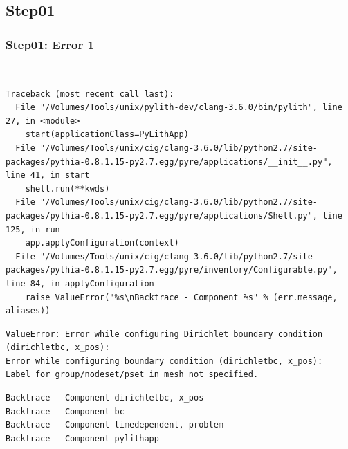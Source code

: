 \documentclass{beamer}
\begin{document}
\subsection{Step01}

\begin{frame}[fragile]
  \frametitle{Step01: Error 1}

\\
\begin{lstlisting}
Traceback (most recent call last):
  File "/Volumes/Tools/unix/pylith-dev/clang-3.6.0/bin/pylith", line 27, in <module>
    start(applicationClass=PyLithApp)
  File "/Volumes/Tools/unix/cig/clang-3.6.0/lib/python2.7/site-packages/pythia-0.8.1.15-py2.7.egg/pyre/applications/__init__.py", line 41, in start
    shell.run(**kwds)
  File "/Volumes/Tools/unix/cig/clang-3.6.0/lib/python2.7/site-packages/pythia-0.8.1.15-py2.7.egg/pyre/applications/Shell.py", line 125, in run
    app.applyConfiguration(context)
  File "/Volumes/Tools/unix/cig/clang-3.6.0/lib/python2.7/site-packages/pythia-0.8.1.15-py2.7.egg/pyre/inventory/Configurable.py", line 84, in applyConfiguration
    raise ValueError("%s\nBacktrace - Component %s" % (err.message, aliases))
\end{lstlisting}
\begin{lstlisting}
ValueError: Error while configuring Dirichlet boundary condition (dirichletbc, x_pos):
Error while configuring boundary condition (dirichletbc, x_pos):
Label for group/nodeset/pset in mesh not specified.
\end{lstlisting}
\begin{lstlisting}
Backtrace - Component dirichletbc, x_pos
Backtrace - Component bc
Backtrace - Component timedependent, problem
Backtrace - Component pylithapp
\end{lstlisting}
  
\end{frame}
\end{document}
